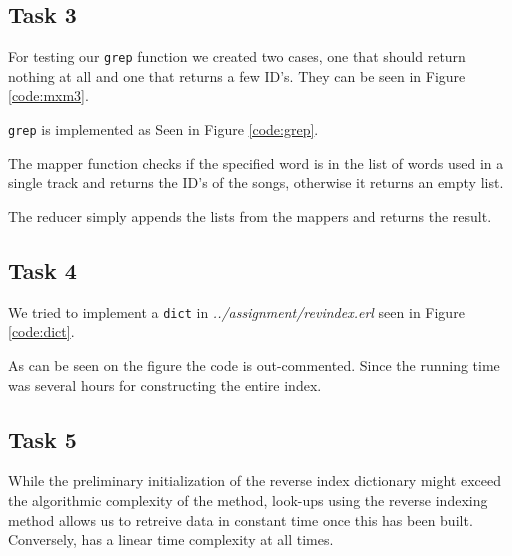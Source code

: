 \subsection{Task 3}
For testing our \texttt{grep} function we created two cases, one that should
return nothing at all and one that returns a few ID's. They can be seen in
Figure \ref{code:mxm3}.


\texttt{grep} is implemented as Seen in Figure \ref{code:grep}.




The mapper function checks if the specified word is in the list of words used in
a single track and returns the ID's of the songs, otherwise it returns an empty
list.

The reducer simply appends the lists from the mappers and returns the result.

\subsection{Task 4}
We tried to implement a \texttt{dict} in \textit{../assignment/revindex.erl} seen in Figure \ref{code:dict}.


As can be seen on the figure the code is out-commented. Since the running time was several hours for constructing the entire index.

\subsection{Task 5}
While the preliminary initialization of the reverse index dictionary might
exceed the algorithmic complexity of the  method, look-ups using
the reverse indexing method allows us to retreive data in constant time once
this has been built. Conversely,  has a linear time complexity at
all times.
